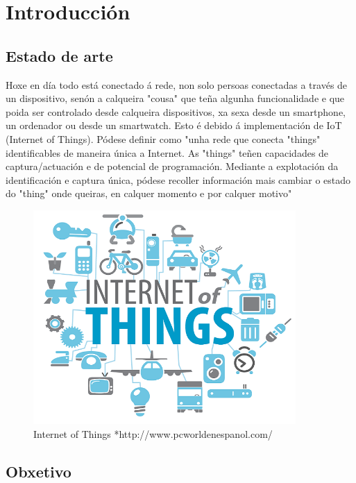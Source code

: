\documentclass[11pt,twoside]{book}
\begin{document}
\cleardoublepage%

\chapter{Introducción}

\section{Estado de arte}

Hoxe en día todo está conectado á rede, non solo persoas conectadas a través de un dispositivo, senón a calqueira "cousa" que teña algunha funcionalidade e que poida ser controlado desde calqueira dispositivos, xa sexa desde un smartphone, un ordenador ou desde un smartwatch. Esto é debido á implementación de IoT (Internet of Things). Pódese definir como "unha rede que conecta "things" identificables de maneira única a Internet. As "things" teñen capacidades de captura/actuación e de potencial de programación. Mediante a explotación  da identificación e captura única, pódese recoller información mais cambiar o estado do "thing" onde queiras, en calquer momento e por calquer motivo" \cite{IoT}

\begin{figure}[H]
	\begin{center}
		\includegraphics[width=10cm]{images/IoT.png}
	\end{center}
	\caption{Internet of Things *http://www.pcworldenespanol.com/}
	\label{fig:IoT}
\end{figure}

\section{Obxetivo}
\end{document}
